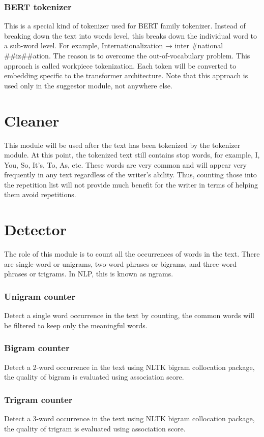 \documentclass[12pt,oneside,openright,a4paper]{cpe-english-project}
\begin{document}
\subsubsection{BERT tokenizer}
This is a special kind of tokenizer used for BERT family tokenizer. Instead of breaking down the text into words level, this breaks down the individual word to a sub-word level. For example, Internationalization → inter \#national \#\#iz\#\#ation. The reason is to overcome the out-of-vocabulary problem. This approach is called workpiece tokenization. Each token will be converted to embedding specific to the transformer architecture. 
Note that this approach is used only in the suggestor module, not anywhere else.

\section{Cleaner}
This module will be used after the text has been tokenized by the tokenizer module. At this point, the tokenized text still contains stop words, for example, I, You, So, It’s, To, As, etc. These words are very common and will appear very frequently in any text regardless of the writer’s ability. Thus, counting those into the repetition list will not provide much benefit for the writer in terms of helping them avoid repetitions.

\section{Detector}
The role of this module is to count all the occurrences of words in the text. There are single-word or unigrams, two-word phrases or bigrams, and three-word phrases or trigrams. In NLP, this is known as ngrams. 
\subsubsection{Unigram counter}
Detect a single word occurrence in the text by counting, the common words will be filtered to keep only the meaningful words. 
\subsubsection{Bigram counter}
Detect a 2-word occurrence in the text using NLTK bigram collocation package, the quality of bigram is evaluated using association score.
\subsubsection{Trigram counter}
Detect a 3-word occurrence in the text using NLTK bigram collocation package, the quality of trigram is evaluated using association score.
\end{document}
